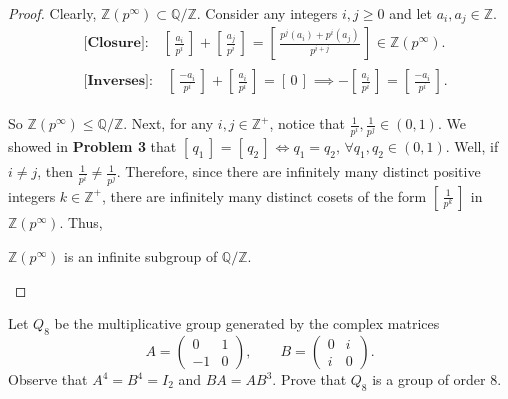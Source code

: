 \documentclass[addpoints,10pt]{exam}
\theoremstyle{plain}
\theoremstyle{definition}
\newtheorem{prob}[thm]{Problem}
\theoremstyle{plain}
\theoremstyle{plain}
\theoremstyle{definition}
\let\oldprob\prob
\let\endoldprob\endprob
\renewenvironment{prob}
  {\begin{singlespace}\oldprob}
  {\endoldprob\end{singlespace}}
\newcommand{\class}[2][]{\ensuremath{\left[\,#2\,\right]_{#1}}}
\newcommand{\QQ}{\ensuremath{\mathbb{Q}}}
\newcommand{\ZZ}{\ensuremath{\mathbb{Z}}}
\begin{document}
\begin{proof}
    Clearly, $\ZZ(p^{\infty})\subset \QQ/\ZZ$. Consider any integers $i,j\geq 0$ and let $a_{i},a_{j}\in \ZZ$. 
    \begin{align*}
      &\textbf{[Closure]:}\quad\class{\frac{a_{i}}{p^{i}}}+\class{\frac{a_{j}}{p^{i}}}=\class{\frac{p^{j}(a_{i})+p^{i}(a_{j})}{p^{i+j}}}\in \ZZ(p^{\infty}).\\
      &\textbf{[Inverses]:}\quad\class{\frac{-a_{i}}{p^{i}}}+\class{\frac{a_{i}}{p^{i}}}=\class{0}\implies -\class{\frac{a_{i}}{p^{i}}}=\class{\frac{-a_{i}}{p^{i}}}.
    \end{align*}

    So $\ZZ(p^{\infty})\leq \QQ/\ZZ$. Next, for any $i,j\in \ZZ^{+}$, notice that $\frac{1}{p^{i}},\frac{1}{p^{j}}\in (0,1)$. We showed in \textbf{Problem 3} that $\class{q_{1}}=\class{q_{2}}\iff q_{1}=q_{2},\,\forall q_{1},q_{2}\in (0,1)$. Well, if $i\neq j$, then $\frac{1}{p^{i}}\neq \frac{1}{p^{j}}$. Therefore, since there are infinitely many distinct positive integers $k\in \ZZ^{+}$, there are infinitely many distinct cosets of the form $\class{\frac{1}{p^{k}}}$ in $\ZZ(p^\infty)$.
    Thus,
    \begin{center}
    $\ZZ(p^{\infty})$ is an infinite subgroup of $\QQ/\ZZ$.
    \end{center}
\end{proof}




\newpage
\setcounter{thm}{4}   %
\begingroup{}
\begin{prob}
  Let $Q_8$ be the multiplicative group generated by the complex matrices
  \[
  A=\begin{pmatrix}0 & 1 \\ -1 & 0\end{pmatrix},
  \qquad
  B=\begin{pmatrix}0 & i \\ i & 0\end{pmatrix}.
  \]
  Observe that $A^4=B^4=I_2$ and $BA=AB^3$. Prove that $Q_8$ is a group of order $8$.
\end{prob}
\end{document}
